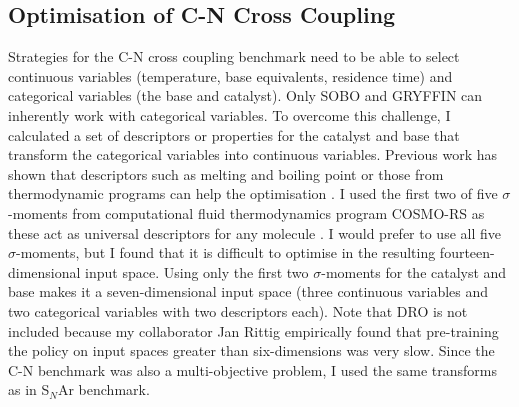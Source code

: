 \subsection{Optimisation of C-N Cross Coupling}

Strategies for the C-N cross coupling benchmark need to be able to select continuous variables (temperature, base equivalents, residence time) and categorical variables (the base and catalyst). Only SOBO and GRYFFIN can inherently work with categorical variables. To overcome this challenge, I calculated a set of descriptors or properties for the catalyst and base that transform the categorical variables into continuous variables. Previous work has shown that descriptors such as melting and boiling point or those from thermodynamic programs can help the optimisation \cite{Amar2019, Hase2020a}. I used the first two of five $\sigma$-moments from computational fluid thermodynamics program COSMO-RS as these act as universal descriptors for any molecule \cite{Zissimos2002}. I would prefer to use all five $\sigma$-moments, but I found that it is difficult to optimise in the resulting fourteen-dimensional input space. Using only the first two $\sigma$-moments for the catalyst and base makes it a seven-dimensional input space (three continuous variables and two categorical variables with two descriptors each).  Note that DRO is not included because my collaborator Jan Rittig empirically found that pre-training the policy on input spaces greater than six-dimensions was very slow. Since the C-N benchmark was also a multi-objective problem, I used the same transforms as in S$_N$Ar benchmark.

